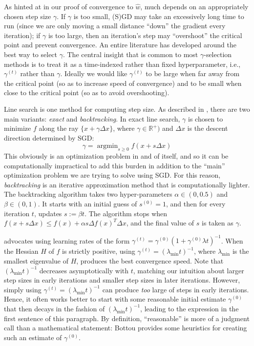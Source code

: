 \documentclass{article}
\DeclareMathOperator*{\argmin}{argmin}
\begin{document}
As hinted at in our proof of convergence to $\hat{w}$, much depends on
an appropriately chosen step size $\gamma$. If $\gamma$ is too small, (S)GD may
take an excessively long time to run (since we are only moving a small distance
``down'' the gradient every iteration); if $\gamma$ is too large, then an
iteration's step may ``overshoot'' the critical point and prevent convergence.
An entire literature has developed around the best way to select $\gamma$. The
central insight that is common to most $\gamma$-selection methods is to treat it
as a time-indexed rather than fixed hyperparameter, i.e., $\gamma^{(t)}$ rather
than $\gamma$. Ideally we would like $\gamma^{(t)}$ to be large when far away
from the critical point (so as to increase speed of convergence) and to be small
when close to the critical point (so as to avoid overshooting).

Line search is one method for computing step size. As described in
\cite{boyd2004convex}, there are two main variants: \textit{exact} and
\textit{backtracking}. In exact line search, $\gamma$ is chosen to minimize $f$
along the ray $\{x + \gamma \Delta x\}$, where $\gamma \in \mathbb{R}^+)$ and
$\Delta x$ is the descent direction determined by SGD:
\begin{equation}
	\gamma = \argmin_{s \geq 0} f(x + s\Delta x)
\end{equation}
This obviously is an optimization problem in and of itself, and
so it can be computationally impractical to add this burden in addition to the
``main'' optimization problem we are trying to solve using SGD. For this reason,
\textit{backtracking} is an iterative approximation method that is
computationally lighter. The backtracking algorithm takes two hyper-parameters
$\alpha \in (0, 0.5)$ and $\beta \in (0, 1)$. It starts with an initial guess of
$s^{(0)} = 1$, and then for every iteration $t$, updates $s := \beta t$. The
algorithm stops when $f(x + s \Delta x) \leq f(x) + \alpha s \Delta f(x)^T
\Delta x$, and the final value of $s$ is taken as $\gamma$. 

\cite{bottou2012stochastic} advocates using learning rates of the form
$\gamma^{(t)} = \gamma^{(0)}(1 + \gamma^{(0)}\lambda t)^{-1}$. When the Hessian
$H$ of $f$ is strictly positive, using $\gamma^{(t)} =
(\lambda_{\mathrm{min}}t)^{-1}$, where $\lambda_{\mathrm{min}}$ is the smallest
eigenvalue of $H$, produces the best convergence speed. Note that $
(\lambda_{\mathrm{min}}t)^{-1}$ decreases asymptotically with $t$, matching our intuition
about larger step sizes in early iterations and smaller step sizes in later
iterations. However, simply using $\gamma^{(t)} =
(\lambda_{\mathrm{min}}t)^{-1}$ can produce \textit{too} large of steps in early
iterations. Hence, it often works better to start with some reasonable initial
estimate $\gamma^{(0)}$ that then decays in the fashion of
$(\lambda_{\mathrm{min}}t)^{-1}$, leading to the expression in the first
sentence of this paragraph. By definition, ``reasonable'' is more of a judgment
call than a mathematical statement: Bottou provides some heuristics for creating
such an estimate of $\gamma^{(0)}$.
\end{document}
